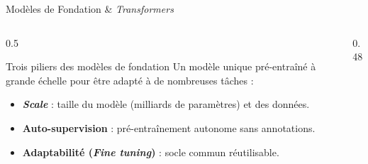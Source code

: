 \documentclass[A4,svgnames,9pt,aspectratio=169]{beamer}
\begin{document}
\begin{frame}{Modèles de Fondation \& \emph{Transformers}}
    \begin{columns}
        \begin{column}{0.5\textwidth}
            \begin{block}{Trois piliers des modèles de fondation}
                Un modèle unique pré-entraîné à grande échelle pour être adapté à de nombreuses tâches :
                \begin{itemize}
                    \item \textbf{\emph{Scale}} : taille du modèle (milliards de paramètres) et des données.
                    \item \textbf{Auto-supervision} : pré-entraînement autonome sans annotations.
                    \item \textbf{Adaptabilité (\emph{Fine tuning})} : socle commun réutilisable.
                \end{itemize}
            \end{block}
        \end{column}
        \begin{column}{0.48\textwidth}
        \end{column}
    \end{columns}
\end{frame}
\end{document}
